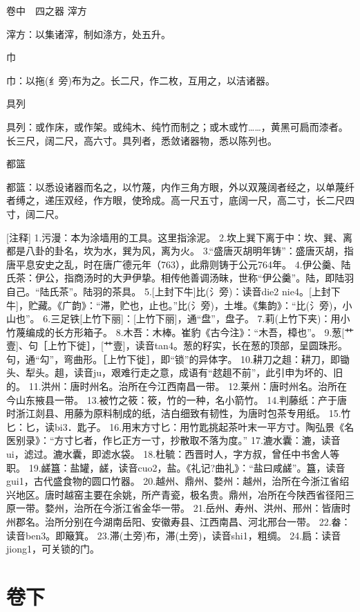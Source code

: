 \documentclass[12pt,UTF8]{ctexbook}
\begin{document}
卷中　四之器
滓方

滓方：以集诸滓，制如涤方，处五升。

巾

巾：以拖(纟旁)布为之。长二尺，作二枚，互用之，以洁诸器。

具列

具列：或作床，或作架。或纯木、纯竹而制之；或木或竹……，黄黑可扃而漆者。长三尺，阔二尺，高六寸。具列者，悉敛诸器物，悉以陈列也。

都篮

都篮：以悉设诸器而名之，以竹蔑，内作三角方眼，外以双蔑阔者经之，以单蔑纤者缚之，递压双经，作方眼，使玲成。高一尺五寸，底阔一尺，高二寸，长二尺四寸，阔二尺。

[注释]
1.污漫：本为涂墙用的工具。这里指涂泥。 
2.坎上巽下离于中：坎、巽、离都是八卦的卦名，坎为水，巽为风，离为火。 
3.“盛唐灭胡明年铸”：盛唐灭胡，指唐平息安史之乱，时在唐广德元年（763），此鼎则铸于公元764年。 
4.伊公羹、陆氏茶：伊公，指商汤时的大尹伊挚。相传他善调汤昧，世称“伊公羹”。陆，即陆羽自己。“陆氏茶”。陆羽的茶具。 
5.[上封下牛]比(氵旁)：读音die2 nie4。[上封下牛]，贮藏。《广韵》：“滞，贮也，止也。”比(氵旁)，土堆。《集韵》：“比(氵旁)，小山也”。 
6.三足铁[上竹下丽]：[上竹下丽]，通“盘”，盘子。 
7.莉(上竹下夹)：用小竹蔑编成的长方形箱子。 
8.木吾：木棒。崔豹《古今注》：“木吾，樟也”。 
9.葱[艹壹]、句［上竹下徙］，[艹壹]，读音tan4。葱的籽实，长在葱的顶部，呈圆珠形。句，通“勾”，弯曲形。［上竹下徙］，即“锁”的异体字。 
10.耕刀之趄：耕刀，即锄头、犁头。趄，读音ju，艰难行走之意，成语有“趑趄不前”，此引申为坏的、旧的。 
11.洪州：唐时州名。治所在今江西南昌一带。 
12.莱州：唐时州名。治所在今山东掖县一带。 
13.被竹之筱：筱，竹的一种，名小箭竹。 
14.判藤纸：产于唐时浙江剡县、用藤为原料制成的纸，洁白细致有韧性，为唐时包茶专用纸。 
15.竹匕：匕，读bi3．匙子。 
16.用末方寸匕：用竹匙挑起茶叶末一平方寸。陶弘景《名医别录》：“方寸匕者，作匕正方一寸，抄散取不落为度。” 
17.漉水囊：漉，读音ui，滤过。漉水囊，即滤水袋。 
18.杜毓：西晋时人，字方叔，曾任中书舍人等职。 
19.鹾簋：盐罐，鹾，读音cuo2，盐。《礼记?曲礼》：“盐曰咸鹾”。簋，读音gui1，古代盛食物的圆口竹器。 
20.越州、鼎州、婺州：越州，治所在今浙江省绍兴地区。唐时越窑主要在余姚，所产青瓷，极名贵。鼎州，冶所在今陕西省径阳三原一带。婺州，治所在今浙江省金华一带。 
21.岳州、寿州、洪州、邢州：皆唐时州郡名。治所分别在今湖南岳阳、安徽寿县、江西南昌、河北邢台一带。 
22.畚：读音ben3。即簸箕。 
23.滞(土旁)布，滞(土旁)，读音shi1，粗绸。 
24.扃：读音jiong1，可关锁的门。 

\part{卷下}
\end{document}
